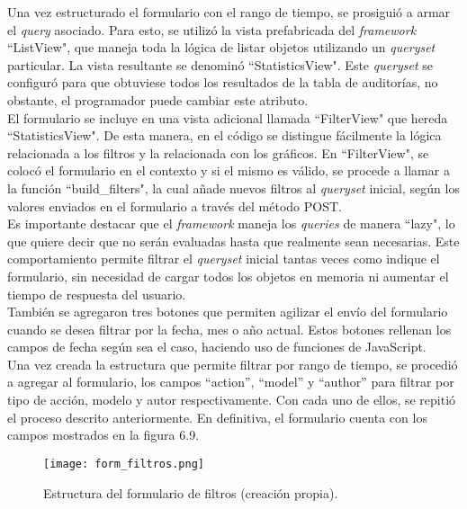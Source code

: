 Una vez estructurado el formulario con el rango de tiempo, se prosiguió a armar el \textit{query} asociado. Para esto, se utilizó la vista prefabricada del \textit{framework} “ListView", que maneja toda la lógica de listar objetos utilizando un \textit{queryset} particular. La vista resultante se denominó “StatisticsView". Este \textit{queryset}  se configuró para que obtuviese todos los resultados de la tabla de auditorías, no obstante, el programador puede cambiar este atributo.\\

El formulario se incluye en una vista adicional llamada “FilterView" que hereda “StatisticsView". De esta manera, en el código se distingue fácilmente la lógica relacionada a los filtros y la relacionada con los gráficos. En “FilterView", se colocó el formulario en el contexto y si el mismo es válido, se procede a llamar a la función “build\_filters", la cual añade nuevos filtros al \textit{queryset} inicial, según los valores enviados en el formulario a través del método POST. \\

Es importante destacar que el \textit{framework} maneja los \textit{queries} de manera “lazy", lo que quiere decir que no serán evaluadas hasta que realmente sean necesarias. Este comportamiento permite filtrar el \textit{queryset} inicial tantas veces como indique el formulario, sin necesidad de cargar todos los objetos en memoria ni aumentar el tiempo de respuesta del usuario.\\

También se agregaron tres botones que permiten agilizar el envío del formulario cuando se desea filtrar por la fecha, mes o año actual. Estos botones rellenan los campos de fecha según sea el caso, haciendo uso de funciones de JavaScript.\\

Una vez creada la estructura que permite filtrar por rango de tiempo, se procedió a agregar al formulario, los campos “action”, “model” y “author” para filtrar por tipo de acción, modelo y autor respectivamente. Con cada uno de ellos, se repitió el proceso descrito anteriormente. En definitiva, el formulario cuenta con los campos mostrados en la figura 6.9.

\begin{figure}[h]
    \centering
    \texttt{[image: form\_filtros.png]}
    \caption{Estructura del formulario de filtros (creación propia).}
    \label{fig:figura6.9}
\end{figure}

